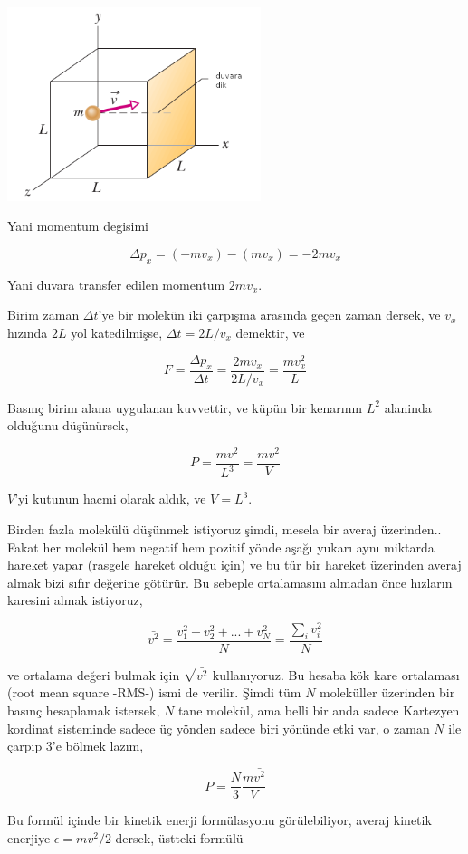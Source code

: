 \documentclass[12pt,fleqn]{article}\usepackage{../../common}
\begin{document}
\includegraphics[width=20em]{phy_005_basics_05.png}

Yani momentum degisimi

$$
\Delta p_x = (-m v_x) - (m v_x) = - 2 m v_x 
$$

Yani duvara transfer edilen momentum $2 m v_x$. 

Birim zaman $\Delta t$'ye bir molekün iki çarpışma arasında geçen zaman dersek,
ve $v_x$ hızında $2L$ yol katedilmişse, $\Delta t  = 2 L / v_x$ demektir, ve

$$
F = \frac{\Delta p_x}{\Delta t} = \frac{2 m v_x}{2 L / v_x} = \frac{m v_x^2}{L}
$$

Basınç birim alana uygulanan kuvvettir, ve küpün bir kenarının $L^2$ alaninda
olduğunu düşünürsek, 

$$
P = \frac{m v^2}{L^3} = \frac{m v^2}{V}
$$

$V$'yi kutunun hacmi olarak aldık, ve $V = L^3$.

Birden fazla molekülü düşünmek istiyoruz şimdi, mesela bir averaj
üzerinden.. Fakat her molekül hem negatif hem pozitif yönde aşağı yukarı aynı
miktarda hareket yapar (rasgele hareket olduğu için) ve bu tür bir hareket
üzerinden averaj almak bizi sıfır değerine götürür. Bu sebeple ortalamasını
almadan önce hızların karesini almak istiyoruz,

$$
\bar{v^2} = \frac{v_1^2 + v_2^2 + ... + v_N^2 }{N} = \frac{\sum_i v_i^2}{N}
$$

ve ortalama değeri bulmak için $\sqrt{\bar{v^2}}$ kullanıyoruz. Bu hesaba kök
kare ortalaması (root mean square -RMS-) ismi de verilir. Şimdi tüm $N$
moleküller üzerinden bir basınç hesaplamak istersek, $N$ tane molekül, ama belli
bir anda sadece Kartezyen kordinat sisteminde sadece üç yönden sadece biri
yönünde etki var, o zaman $N$ ile çarpıp 3'e bölmek lazım, 

$$
P = \frac{N}{3} \frac{m \bar{v^2}}{V}
$$

Bu formül içinde bir kinetik enerji formülasyonu görülebiliyor, averaj kinetik
enerjiye $\epsilon = m \bar{v^2} / 2$ dersek, üstteki formülü
\end{document}

